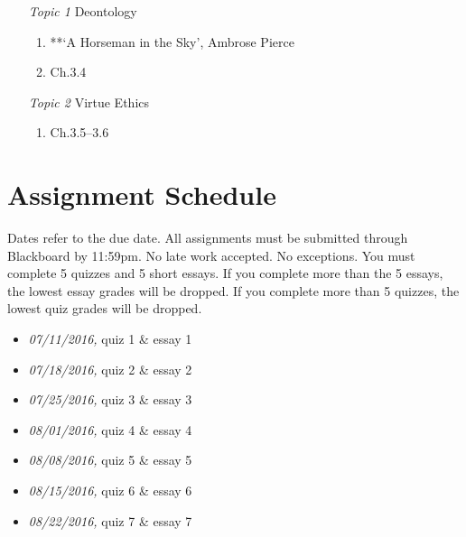 \documentclass[article,oneside]{memoir}
\begin{document}
\begin{description}
\begin{enumerate}
\item[\textit{Topic 1}] Deontology
\begin{enumerate}
\item **`A Horseman in the Sky', Ambrose Pierce
\item Ch.3.4
\end{enumerate}

\item[\textit{Topic 2}] Virtue Ethics
\begin{enumerate}
\item Ch.3.5--3.6
\end{enumerate}
\end{enumerate}

\end{description}





\section{ Assignment Schedule}
Dates refer to the due date. All assignments must be submitted through Blackboard by 11:59pm. No late work accepted. No exceptions. You must complete 5 quizzes and 5 short essays. If you complete more than the 5 essays, the lowest essay grades will be dropped. If you complete more than 5 quizzes, the lowest quiz grades will be dropped. 
\begin{itemize}
\item \textit{07/11/2016,} quiz 1 \& essay 1
\item \textit{07/18/2016,} quiz 2 \& essay 2
\item \textit{07/25/2016,} quiz 3 \& essay 3
\item \textit{08/01/2016,} quiz 4 \& essay 4
\item \textit{08/08/2016,} quiz 5 \& essay 5
\item \textit{08/15/2016,} quiz 6 \& essay 6
\item \textit{08/22/2016,}  quiz 7 \& essay 7
\end{itemize}






\end{document}
